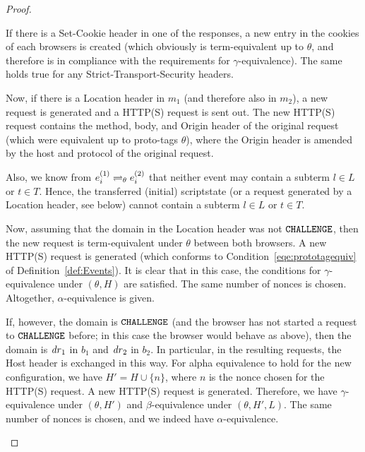 \begin{theorem}
\begin{proof}
\begin{description}
\begin{enumerate}[I.]
\begin{enumerate}
              If there is a Set-Cookie header in one of the responses, a new
              entry in the cookies of each browsers is created (which
              obviously is term-equivalent up to $\theta$, and therefore is
              in compliance with the requirements for $\gamma$-equivalence).
              The same holds true for any Strict-Transport-Security headers.
      
              Now, if there is a Location header in $m_1$ (and therefore
              also in $m_2$), a new request is generated and a HTTP(S) request is sent out. 
              The new HTTP(S) request contains the method, body, and Origin
              header of the original request (which were equivalent up to
              proto-tags $\theta$), where the Origin header is amended by
              the host and protocol of the original request.
      
              Also, we know from
              $e_i^{(1)} \rightleftharpoons_{\theta} e_i^{(2)}$ that neither
              event may contain a subterm $l\in L$ or $t \in T$. Hence, the
              transferred (initial) scriptstate (or a request generated by a
              Location header, see below) cannot contain a subterm $l \in L$
              or $t \in T$.
      
              Now, assuming that the domain in the Location header was not
              $\mathtt{CHALLENGE}$, then the new request is term-equivalent
              under $\theta$ between both browsers. A new HTTP(S) request is
              generated (which conforms to Condition~\ref{eqe:prototagequiv}
              of Definition~\ref{def:Events}). It is clear that in this case, the conditions for
              $\gamma$-equivalence under $(\theta, H)$ are satisfied. 
              The same number of nonces is chosen. Altogether, $\alpha$-equivalence is given.
      
              If, however, the domain is $\mathtt{CHALLENGE}$ (and the browser
              has not started a request to $\mathtt{CHALLENGE}$ before; in this
              case the browser would behave as above), then the domain is
              $\mathit{dr}_1$ in $b_1$ and $\mathit{dr}_2$ in $b_2$. In particular,
              in the resulting requests, the Host header is exchanged in
              this way. For alpha equivalence to hold for the new
              configuration, we have $H' = H \cup \{n\}$, where $n$ is the
              nonce chosen for the HTTP(S) request. A new HTTP(S) request is
              generated. Therefore, we have
              $\gamma$-equivalence under $(\theta, H')$ and
              $\beta$-equivalence under $(\theta, H', L)$. The same number
              of nonces is chosen, and we indeed have $\alpha$-equivalence.
      

\end{enumerate}
\end{enumerate}
\end{description}
\end{proof}
\end{theorem}
